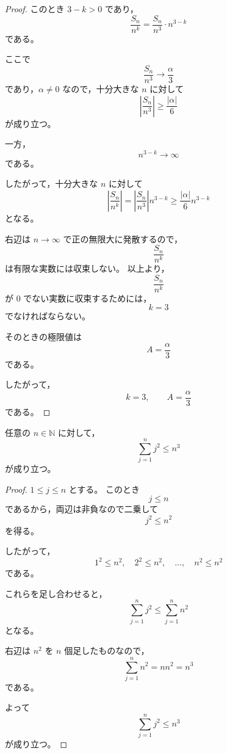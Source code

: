 \begin{proof}
	このとき $3-k>0$ であり，
	\[
	\frac{S_n}{n^k}
	=
	\frac{S_n}{n^3}\cdot n^{3-k}
	\]
	である。
	
	ここで
	\[
	\frac{S_n}{n^3}\to\frac{\alpha}{3}
	\]
	であり，$\alpha\neq0$ なので，十分大きな $n$ に対して
	\[
	\left|\frac{S_n}{n^3}\right|
	\geq
	\frac{|\alpha|}{6}
	\]
	が成り立つ。
	
	一方，
	\[
	n^{3-k}\to\infty
	\]
	である。
	
	したがって，十分大きな $n$ に対して
	\[
	\left|\frac{S_n}{n^k}\right|
	=
	\left|\frac{S_n}{n^3}\right|n^{3-k}
	\geq
	\frac{|\alpha|}{6}n^{3-k}
	\]
	となる。
	
	右辺は $n\to\infty$ で正の無限大に発散するので，
	\[
	\frac{S_n}{n^k}
	\]
	は有限な実数には収束しない。
		以上より，
	\[
	\frac{S_n}{n^k}
	\]
	が $0$ でない実数に収束するためには，
	\[
	k=3
	\]
	でなければならない。
	
	そのときの極限値は
	\[
	A=\frac{\alpha}{3}
	\]
	である。
	
	したがって，
	\[
	\boxed{k=3,\qquad A=\frac{\alpha}{3}}
	\]
	である。
\end{proof}
\begin{lemma}
	任意の $n\in\mathbb{N}$ に対して，
	\[
	\sum_{j=1}^{n}j^2\leq n^3
	\]
	が成り立つ。
\end{lemma}

\begin{proof}
	$1\leq j\leq n$ とする。
	このとき
	\[
	j\leq n
	\]
	であるから，両辺は非負なので二乗して
	\[
	j^2\leq n^2
	\]
	を得る。
	
	したがって，
	\[
	1^2\leq n^2,\quad
	2^2\leq n^2,\quad
	\ldots,\quad
	n^2\leq n^2
	\]
	である。
	
	これらを足し合わせると，
	\[
	\sum_{j=1}^{n}j^2
	\leq
	\sum_{j=1}^{n}n^2
	\]
	となる。
	
	右辺は $n^2$ を $n$ 個足したものなので，
	\[
	\sum_{j=1}^{n}n^2=nn^2=n^3
	\]
	である。
	
	よって
	\[
	\sum_{j=1}^{n}j^2\leq n^3
	\]
	が成り立つ。
\end{proof}